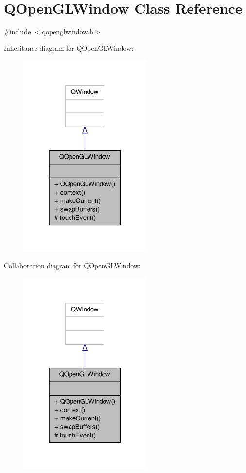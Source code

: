 \hypertarget{classQOpenGLWindow}{\section{Q\-Open\-G\-L\-Window Class Reference}
\label{classQOpenGLWindow}
}


{\ttfamily \#include $<$qopenglwindow.\-h$>$}



Inheritance diagram for Q\-Open\-G\-L\-Window\-:
\nopagebreak
\begin{figure}[H]
\begin{center}
\leavevmode
\includegraphics[width=190pt]{classQOpenGLWindow__inherit__graph}
\end{center}
\end{figure}


Collaboration diagram for Q\-Open\-G\-L\-Window\-:
\nopagebreak
\begin{figure}[H]
\begin{center}
\leavevmode
\includegraphics[width=190pt]{classQOpenGLWindow__coll__graph}
\end{center}
\end{figure}

